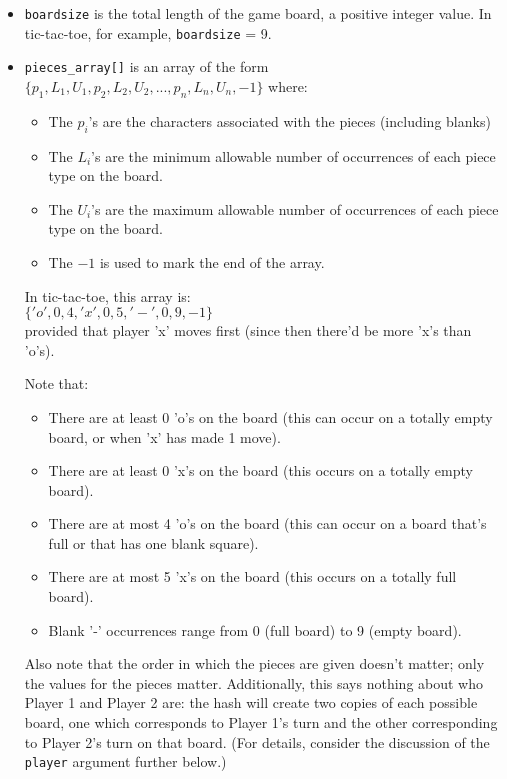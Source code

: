 \documentclass[11pt]{article}
\begin{document}
\begin{itemize}
\item \texttt{boardsize} is the total length of the game board, a positive integer value. In tic-tac-toe, for example, \texttt{boardsize} = 9.

\item \texttt{pieces\_array[]} is an array of the form\\
$\{p_1, L_1, U_1, p_2, L_2, U_2, ... , p_n, L_n, U_n, -1\}$ where:
\begin{itemize}
\item The $p_i$'s are the characters associated with the pieces (including blanks)
\item The $L_i$'s are the minimum allowable number of occurrences of each piece type on the board.
\item The $U_i$'s are the maximum allowable number of occurrences of each piece type on the board.
\item The $-1$ is used to mark the end of the array.
\end{itemize}

In tic-tac-toe, this array is:\\
$\{'o', 0, 4, 'x', 0, 5, '-', 0, 9, -1\}$\\
provided that player 'x' moves first (since then there'd be more 'x's than 'o's).

Note that:
\begin{itemize}
\item There are at least 0 'o's on the board (this can occur on a totally empty board, or when 'x' has made 1 move).
\item There are at least 0 'x's on the board (this occurs on a totally empty board).
\item There are at most 4 'o's on the board (this can occur on a board that's full or that has one blank square).
\item There are at most 5 'x's on the board (this occurs on a totally full board).
\item Blank '-' occurrences range from 0 (full board) to 9 (empty board).
\end{itemize}

Also note that the order in which the pieces are given doesn't matter; only the values for the pieces matter. Additionally, this says nothing about who Player 1 and Player 2 are: the hash will create two copies of each possible board, one which corresponds to Player 1's turn and the other corresponding to Player 2's turn on that board. (For details, consider the discussion of the \texttt{player} argument further below.)


\end{itemize}
\end{document}
